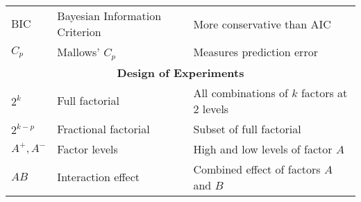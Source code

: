 \documentclass[10pt]{article}
\begin{document}
\begin{center}
\begin{tabular}{l l l}
    $\text{BIC}$               & Bayesian Information Criterion & More conservative than AIC                              \\
    $C_p$                      & Mallows' $C_p$                 & Measures prediction error                               \\
    \midrule
    \multicolumn{3}{c}{\textbf{Design of Experiments}}                                                                    \\
    $2^k$                      & Full factorial                 & All combinations of $k$ factors at 2 levels             \\
    $2^{k-p}$                  & Fractional factorial           & Subset of full factorial                                \\
    $A^+, A^-$                 & Factor levels                  & High and low levels of factor $A$                       \\
    $AB$                       & Interaction effect             & Combined effect of factors $A$ and $B$                  \\
    \bottomrule
  \end{tabular}
\end{center}
\end{document}
